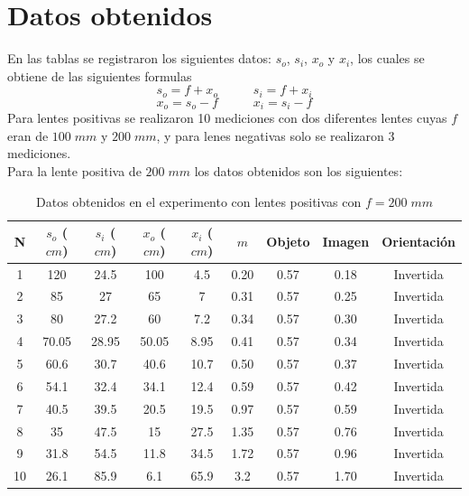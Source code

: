 \documentclass[13,twocolumn,letterpaper]{article}
\begin{document}
\section*{Datos obtenidos}

		En las tablas se registraron los siguientes datos: $s_{o}$, $s_{i}$, $x_{o}$ y $x_{i}$, los cuales se obtiene de las siguientes formulas
	$$ s_{o}=f+x_{o}\;\;\;\;\;\;\;
	\;\;\;s_{i}=f+x_{i}$$
	$$x_{o}=s_{o}-f \;\;\;\;\;\;\;
	\;\;\;
	x_{i}=s_{i}-f	$$
	Para lentes positivas se realizaron 10 mediciones con dos diferentes lentes cuyas $f$ eran de $100 \; mm$ y $200\; mm$, y para lenes negativas solo se realizaron 3 mediciones.\\
	Para la lente positiva de $200\; mm$ los datos obtenidos son los siguientes:
		 


\begin{table}[htb]
	\centering
	\begin{tabular}{|| c | c | c | c | c | c | c | c | c ||}
\hline \hline 
		N & $s_{o}$ ($cm$) & $s_{i}$ ($cm$) & $x_{o}$  ($cm$) & $x_{i}$ ($cm$) & $m$ & Objeto & Imagen & Orientación \\ \hline \hline
		1 &  120  & 24.5  & 100   & 4.5  & 0.20 &  0.57  & 0.18 & Invertida \\
		2 &  85   & 27    & 65    & 7    & 0.31 &  0.57  & 0.25 & Invertida \\
		3 &  80   & 27.2  & 60    & 7.2  & 0.34 &  0.57  & 0.30 & Invertida\\
		4 & 70.05 & 28.95 & 50.05 & 8.95 & 0.41 &  0.57  & 0.34 & Invertida \\
		5 &  60.6 & 30.7  & 40.6  & 10.7 & 0.50 &  0.57  & 0.37 & Invertida \\
		6 &  54.1 & 32.4  & 34.1  & 12.4 & 0.59 &  0.57  & 0.42 & Invertida\\
		7 &  40.5 & 39.5  & 20.5  & 19.5 & 0.97 &  0.57  & 0.59 & Invertida  \\
		8 &  35   & 47.5  & 15    & 27.5 & 1.35 &  0.57  & 0.76 & Invertida\\
		9 &  31.8 & 54.5  & 11.8  & 34.5 & 1.72 &  0.57  & 0.96 & Invertida \\
		10 & 26.1 & 85.9  & 6.1   & 65.9 & 3.2  &  0.57  & 1.70 & Invertida \\ \hline
	\end{tabular}
	\caption{Datos obtenidos en el experimento con lentes positivas con $f=200\;mm$} \label{tabla1}
\end{table}
\end{document}
